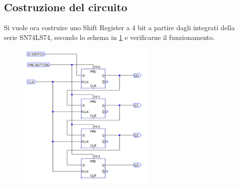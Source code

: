 \documentclass[10pt, a4paper, italian]{article}
\begin{document}
\subsection{Costruzione del circuito}
Si vuole ora costruire uno Shift Register a 4 bit a partire dagli integrati della serie SN74LS74, secondo lo schema in \cref{fig: schem_shift} e verificarne il funzionamento.
\begin{figure}[htbp]
\centering
	\includegraphics[width=0.6\textwidth]{schem_shift}
	\caption{\label{fig: schem_shift}}
\end{figure}
\end{document}
